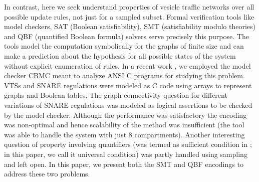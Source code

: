 %
%
%
%
%
%
%
%

In contrast, here we seek understand properties of vesicle traffic networks over all possible update rules, not just for a sampled subset.
%
Formal verification tools like model checkers, SAT (Boolean satisfiability), SMT (satisfiability modulo theories) and QBF (quantified Boolean formula) solvers serve precisely this purpose. 
%
The tools model the computation symbolically for the graphs of finite size and can make a prediction about the hypothesis for all possible states of the system without explicit enumeration of rules. 
%
In a recent work \cite{shukla2017discovering}, we employed the model checker CBMC \cite{ckl2004} meant to analyze ANSI C programs for studying this problem. 
%
VTSs and SNARE regulations were modeled as C code using arrays to represent graphs and Boolean tables. 
%
The graph connectivity question for different variations of SNARE regulations was modeled as logical assertions to be checked by the model checker. 
%
Although the performance was satisfactory the encoding was non-optimal and hence scalability of the method was insufficient (the tool was able to handle the system with just 8 compartments).
%
Another interesting question of property involving quantifiers (was termed as sufficient condition in \cite{shukla2017discovering}; in this paper, we call it universal condition) was partly handled using sampling and left open.
%
In this paper, we present both the SMT and QBF encodings to address these two problems.
%

